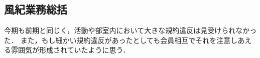 \subsection*{風紀業務総括}

今期も前期と同じく，活動や部室内において大きな規約違反は見受けられなかった．
また，もし細かい規約違反があったとしても会員相互でそれを注意しあえる雰囲気が形成されていたように思う．
